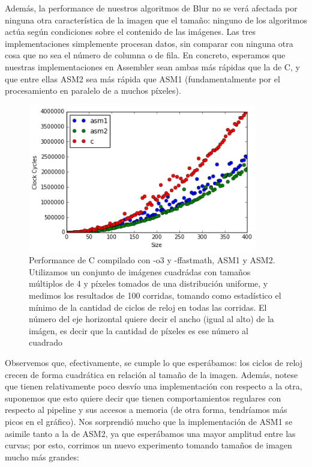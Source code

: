 Además, la performance de nuestros algoritmos de Blur no se verá afectada por ninguna otra característica de la imagen que el tamaño: ninguno de los algoritmos actúa según condiciones sobre el contenido de las imágenes. Las tres implementaciones simplemente procesan datos, sin comparar con ninguna otra cosa que no sea el número de columna o de fila. En concreto, esperamos que nuestras implementaciones en Assembler sean ambas más rápidas que la de C, y que entre ellas ASM2 sea más rápida que ASM1 (fundamentalmente por el procesamiento en paralelo de a muchos píxeles).

\begin{figure}[!b]
	\centering
  \includegraphics[width=10cm]{images/blur-imagenes-chicas.png}
  \caption{Performance de C compilado con -o3 y -ffastmath, ASM1 y ASM2. Utilizamos un conjunto de imágenes cuadrádas con tamaños múltiplos de 4 y píxeles tomados de una distribución uniforme, y medimos los resultados de 100 corridas, tomando como estadístico el mínimo de la cantidad de ciclos de reloj en todas las corridas. El número del eje horizontal quiere decir el ancho (igual al alto) de la imágen, es decir que la cantidad de píxeles es ese número al cuadrado}
\end{figure}

Observemos que, efectivamente, se cumple lo que esperábamos: los ciclos de reloj crecen de forma cuadrática en relación al tamaño de la imagen. Además, notese que tienen relativamente poco desvío una implementación con respecto a la otra, suponemos que esto quiere decir que tienen comportamientos regulares con respecto al pipeline y sus accesos a memoria (de otra forma, tendríamos más picos en el gráfico). Nos sorprendió mucho que la implementación de ASM1 se asimile tanto a la de ASM2, ya que esperábamos una mayor amplitud entre las curvas; por esto, corrimos un nuevo experimento tomando tamaños de imagen mucho más grandes:

